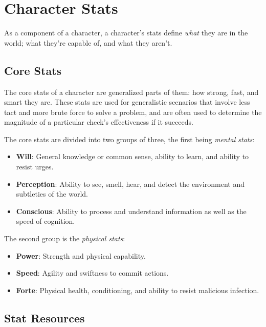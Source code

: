 \documentclass[../main.tex]{subfiles}
\begin{document}
    \section{Character Stats}

        As a component of a character, a character's stats define \emph{what} they are in the world; what they're capable of, and what they aren't.

    \subsection{Core Stats}

        The core stats of a character are generalized parts of them: how strong, fast, and smart they are. These stats are used for generalistic scenarios that involve less tact and more brute force to solve a problem, and are often used to determine the magnitude of a particular check's effectiveness if it succeeds.

        The core stats are divided into two groups of three, the first being \emph{mental stats}:

    \begin{itemize}
        \item \textbf{Will}: General knowledge or common sense, ability to learn, and ability to resist urges. 
        \item \textbf{Perception}: Ability to see, smell, hear, and detect the environment and subtleties of the world.
        \item \textbf{Conscious}: Ability to process and understand information as well as the speed of cognition.
    \end{itemize}

        The second group is the {\em physical stats}:

    \begin{itemize}
        \item \textbf{Power}: Strength and physical capability.
        \item \textbf{Speed}: Agility and swiftness to commit actions.
        \item \textbf{Forte}: Physical health, conditioning, and ability to resist malicious infection.
    \end{itemize}

    \subsection{Stat Resources}
\end{document}
